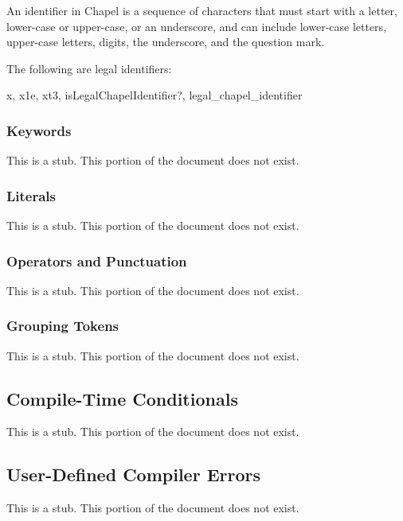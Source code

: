 An identifier in Chapel is a sequence of characters that must start
with a letter, lower-case or upper-case, or an underscore, and can
include lower-case letters, upper-case letters, digits, the
underscore, and the question mark.
\begin{example}
The following are legal identifiers:
\begin{chapel}
  x, x1e, xt3, isLegalChapelIdentifier?, legal_chapel_identifier
\end{chapel}
\end{example}

\subsubsection{Keywords}
\label{Keywords}

This is a stub.  This portion of the document does not exist.

\subsubsection{Literals}
\label{Literals}

This is a stub.  This portion of the document does not exist.

\subsubsection{Operators and Punctuation}
\label{Operators_and_Punctuation}

This is a stub.  This portion of the document does not exist.

\subsubsection{Grouping Tokens}
\label{Grouping_Tokens}

This is a stub.  This portion of the document does not exist.

\subsection{Compile-Time Conditionals}
\label{Compile-Time_Conditionals}

This is a stub.  This portion of the document does not exist.

\subsection{User-Defined Compiler Errors}
\label{User-Defined_Compiler_Errors}

This is a stub.  This portion of the document does not exist.
